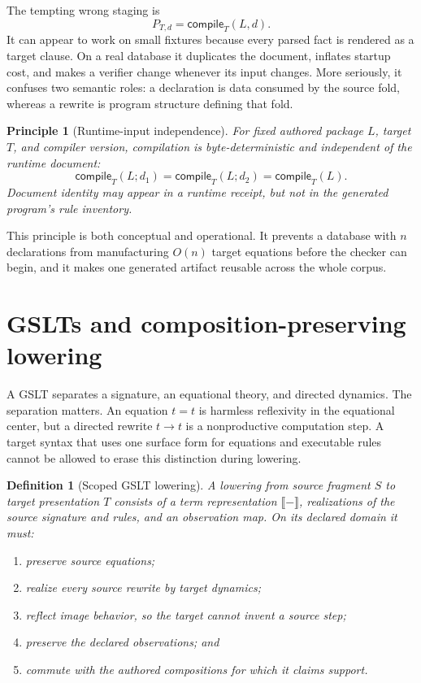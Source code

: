 \documentclass[11pt]{article}
\newtheorem{definition}{Definition}
\newtheorem{principle}{Principle}
\theoremstyle{remark}
\begin{document}
The tempting wrong staging is
\[
   P_{T,d} = \mathsf{compile}_T(L,d).
\]
It can appear to work on small fixtures because every parsed fact is rendered
as a target clause.  On a real database it duplicates the document, inflates
startup cost, and makes a verifier change whenever its input changes.  More
seriously, it confuses two semantic roles: a declaration is data consumed by
the source fold, whereas a rewrite is program structure defining that fold.

\begin{principle}[Runtime-input independence]
For fixed authored package $L$, target $T$, and compiler version, compilation
is byte-deterministic and independent of the runtime document:
\[
  \mathsf{compile}_T(L;d_1)=\mathsf{compile}_T(L;d_2)
  =\mathsf{compile}_T(L).
\]
Document identity may appear in a runtime receipt, but not in the generated
program's rule inventory.
\end{principle}

This principle is both conceptual and operational.  It prevents a database
with $n$ declarations from manufacturing $O(n)$ target equations before the
checker can begin, and it makes one generated artifact reusable across the
whole corpus.

\section{GSLTs and composition-preserving lowering}

A GSLT separates a signature, an equational theory, and directed dynamics.
The separation matters.  An equation $t=t$ is harmless reflexivity in the
equational center, but a directed rewrite $t\longrightarrow t$ is a
nonproductive computation step.  A target syntax that uses one surface form
for equations and executable rules cannot be allowed to erase this
distinction during lowering.

\begin{definition}[Scoped GSLT lowering]
A lowering from source fragment $S$ to target presentation $T$ consists of a
term representation $\llbracket-\rrbracket$, realizations of the source
signature and rules, and an observation map.  On its declared domain it must:
\begin{enumerate}[label=(\roman*)]
\item preserve source equations;
\item realize every source rewrite by target dynamics;
\item reflect image behavior, so the target cannot invent a source step;
\item preserve the declared observations; and
\item commute with the authored compositions for which it claims support.
\end{enumerate}
\end{definition}
\end{document}
